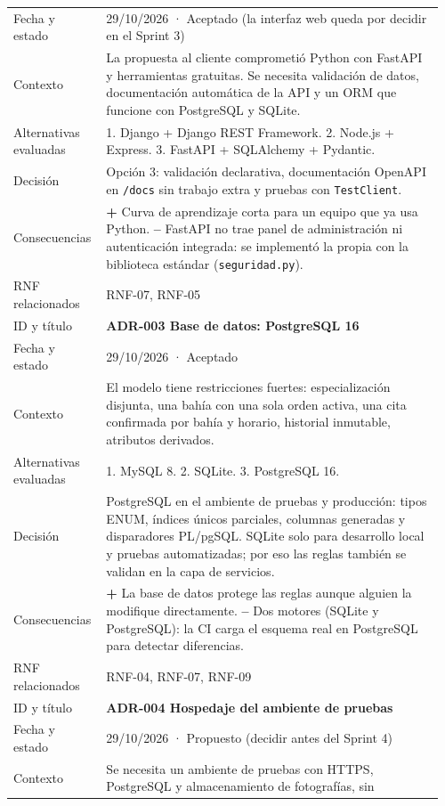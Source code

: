 {\begin{longtable}{@{}L{0.2\linewidth}L{0.76\linewidth}@{}}
Fecha y estado & 29/10/2026 · Aceptado (la interfaz web queda por decidir en el Sprint 3) \\
Contexto & La propuesta al cliente comprometió Python con FastAPI y herramientas gratuitas. Se necesita
validación de datos, documentación automática de la API y un ORM que funcione con PostgreSQL y SQLite. \\
Alternativas evaluadas & 1. Django + Django REST Framework. 2. Node.js + Express. 3. FastAPI + SQLAlchemy +
Pydantic. \\
Decisión & Opción 3: validación declarativa, documentación OpenAPI en \texttt{/docs} sin trabajo extra y
pruebas con \texttt{TestClient}. \\
Consecuencias & \textbf{+} Curva de aprendizaje corta para un equipo que ya usa Python. \textbf{--} FastAPI
no trae panel de administración ni autenticación integrada: se implementó la propia con la biblioteca
estándar (\texttt{seguridad.py}). \\
RNF relacionados & RNF-07, RNF-05 \\
\midrule
ID y título & \textbf{ADR-003 Base de datos: PostgreSQL 16} \\
Fecha y estado & 29/10/2026 · Aceptado \\
Contexto & El modelo tiene restricciones fuertes: especialización disjunta, una bahía con una sola orden
activa, una cita confirmada por bahía y horario, historial inmutable, atributos derivados. \\
Alternativas evaluadas & 1. MySQL 8. 2. SQLite. 3. PostgreSQL 16. \\
Decisión & PostgreSQL en el ambiente de pruebas y producción: tipos ENUM, índices únicos parciales,
columnas generadas y disparadores PL/pgSQL. SQLite solo para desarrollo local y pruebas automatizadas;
por eso las reglas también se validan en la capa de servicios. \\
Consecuencias & \textbf{+} La base de datos protege las reglas aunque alguien la modifique directamente.
\textbf{--} Dos motores (SQLite y PostgreSQL): la CI carga el esquema real en PostgreSQL para detectar
diferencias. \\
RNF relacionados & RNF-04, RNF-07, RNF-09 \\
\midrule
ID y título & \textbf{ADR-004 Hospedaje del ambiente de pruebas} \\
Fecha y estado & 29/10/2026 · Propuesto (decidir antes del Sprint 4) \\
Contexto & Se necesita un ambiente de pruebas con HTTPS, PostgreSQL y almacenamiento de fotografías, sin

\end{longtable}}
